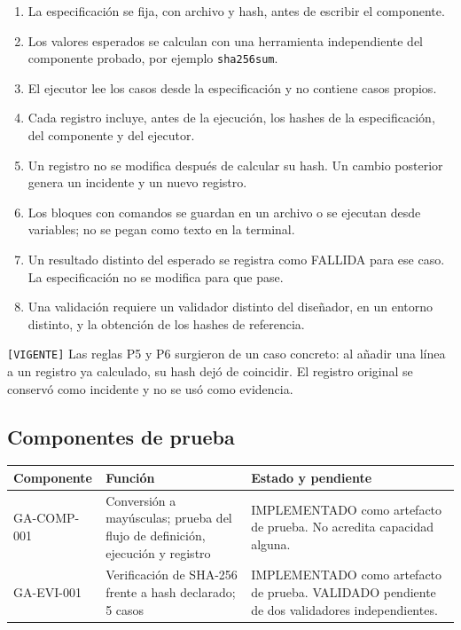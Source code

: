 \documentclass[12pt]{article}
\begin{document}
\begin{enumerate}[label=P\arabic*.]
    \item La especificación se fija, con archivo y hash, antes de escribir el componente.
    \item Los valores esperados se calculan con una herramienta independiente del componente probado, por ejemplo \texttt{sha256sum}.
    \item El ejecutor lee los casos desde la especificación y no contiene casos propios.
    \item Cada registro incluye, antes de la ejecución, los hashes de la especificación, del componente y del ejecutor.
    \item Un registro no se modifica después de calcular su hash. Un cambio posterior genera un incidente y un nuevo registro.
    \item Los bloques con comandos se guardan en un archivo o se ejecutan desde variables; no se pegan como texto en la terminal.
    \item Un resultado distinto del esperado se registra como FALLIDA para ese caso. La especificación no se modifica para que pase.
    \item Una validación requiere un validador distinto del diseñador, en un entorno distinto, y la obtención de los hashes de referencia.
\end{enumerate}

\texttt{[VIGENTE]} Las reglas P5 y P6 surgieron de un caso concreto: al
añadir una línea a un registro ya calculado, su hash dejó de coincidir. El
registro original se conservó como incidente y no se usó como evidencia.

\subsection{Componentes de prueba}

\begin{longtable}{|p{3.4cm}|p{4.6cm}|p{6cm}|}
\hline
\textbf{Componente} & \textbf{Función} & \textbf{Estado y pendiente} \\
\hline
\endhead
GA-COMP-001 & Conversión a mayúsculas; prueba del flujo de definición, ejecución y registro & IMPLEMENTADO como artefacto de prueba. No acredita capacidad alguna. \\
\hline
GA-EVI-001 & Verificación de SHA-256 frente a hash declarado; 5 casos & IMPLEMENTADO como artefacto de prueba. VALIDADO pendiente de dos validadores independientes. \\
\hline
\end{longtable}
\end{document}
